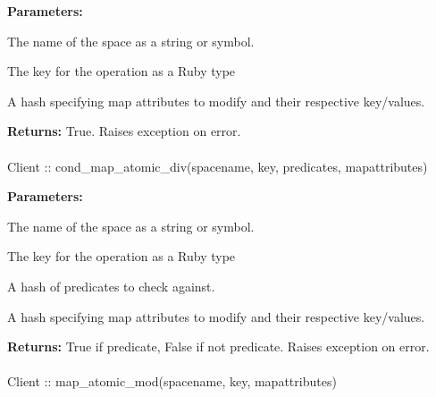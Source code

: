 \noindent\textbf{Parameters:}
\begin{description}[labelindent=\widthof{{\code{mapattributes}}},leftmargin=*,noitemsep,nolistsep,align=right]
\item[\code{spacename}] The name of the space as a string or symbol.
\item[\code{key}] The key for the operation as a Ruby type
\item[\code{mapattributes}] A hash specifying map attributes to modify and their respective key/values.
\end{description}

\noindent\textbf{Returns:}
True.  Raises exception on error.

\paragraph{}
\begin{ccode}
Client :: cond_map_atomic_div(spacename, key, predicates, mapattributes)
\end{ccode}
\funcdesc 

\noindent\textbf{Parameters:}
\begin{description}[labelindent=\widthof{{\code{mapattributes}}},leftmargin=*,noitemsep,nolistsep,align=right]
\item[\code{spacename}] The name of the space as a string or symbol.
\item[\code{key}] The key for the operation as a Ruby type
\item[\code{predicates}] A hash of predicates to check against.
\item[\code{mapattributes}] A hash specifying map attributes to modify and their respective key/values.
\end{description}

\noindent\textbf{Returns:}
True if predicate, False if not predicate.  Raises exception on error.

\paragraph{}
\begin{ccode}
Client :: map_atomic_mod(spacename, key, mapattributes)
\end{ccode}
\funcdesc 

